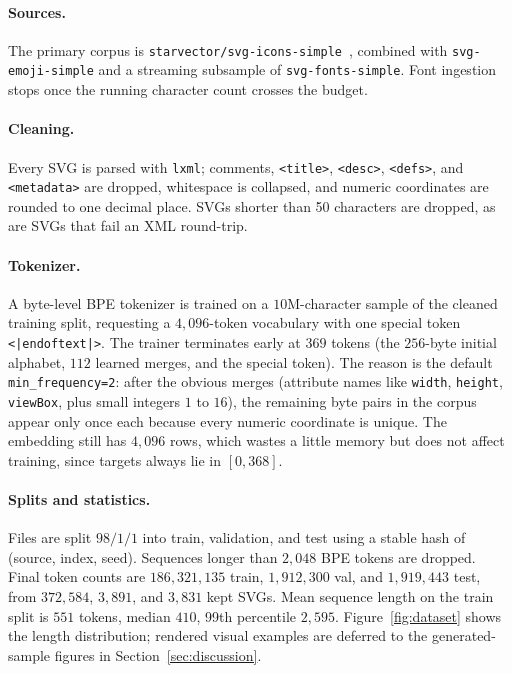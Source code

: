 \documentclass[11pt]{article}
\begin{document}
\paragraph{Sources.}
The primary corpus is \texttt{starvector/svg-icons-simple}~\citep{rodriguez2023starvector}, combined with \texttt{svg-emoji-simple} and a streaming subsample of \texttt{svg-fonts-simple}. Font ingestion stops once the running character count crosses the budget.

\paragraph{Cleaning.}
Every SVG is parsed with \texttt{lxml}; comments, \texttt{<title>}, \texttt{<desc>}, \texttt{<defs>}, and \texttt{<metadata>} are dropped, whitespace is collapsed, and numeric coordinates are rounded to one decimal place. SVGs shorter than 50 characters are dropped, as are SVGs that fail an XML round-trip.

\paragraph{Tokenizer.}
A byte-level BPE tokenizer is trained on a $10$M-character sample of the cleaned training split, requesting a $4{,}096$-token vocabulary with one special token \texttt{<|endoftext|>}. The trainer terminates early at $369$ tokens (the $256$-byte initial alphabet, $112$ learned merges, and the special token). The reason is the default \texttt{min\_frequency=2}: after the obvious merges (attribute names like \texttt{width}, \texttt{height}, \texttt{viewBox}, plus small integers $1$ to $16$), the remaining byte pairs in the corpus appear only once each because every numeric coordinate is unique. The embedding still has $4{,}096$ rows, which wastes a little memory but does not affect training, since targets always lie in $[0, 368]$.

\paragraph{Splits and statistics.}
Files are split $98/1/1$ into train, validation, and test using a stable hash of (source, index, seed). Sequences longer than $2{,}048$ BPE tokens are dropped. Final token counts are $186{,}321{,}135$ train, $1{,}912{,}300$ val, and $1{,}919{,}443$ test, from $372{,}584$, $3{,}891$, and $3{,}831$ kept SVGs. Mean sequence length on the train split is $551$ tokens, median $410$, 99th percentile $2{,}595$. Figure~\ref{fig:dataset} shows the length distribution; rendered visual examples are deferred to the generated-sample figures in Section~\ref{sec:discussion}.
\end{document}
